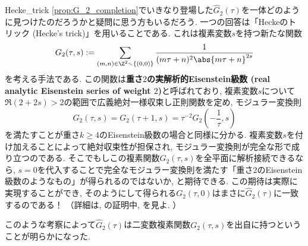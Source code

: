 \documentclass[11pt,b5paper,oneside,lualatex]{ltjsarticle} %
\numberwithin{equation}{section} %
\begin{document}
\begin{rem}{}{Hecke_trick}
	\cref{prop:G_2_completion}でいきなり登場した$ \widehat{G}_2 (\tau) $を一体どのように見つけたのだろうかと疑問に思う方もいるだろう. 
	一つの回答は「Heckeのトリック (Hecke's trick)」を用いることである. 
	これは複素変数$ s $を持つ新たな関数
	\[
	G_2 (\tau, s) := \sum_{(m, n) \in \Z^2 \smallsetminus \{ (0, 0) \}} \frac{1}{(m\tau + n)^2 \abs{m\tau + n}^{2s}}
	\]
	を考える手法である. 
	この関数は\textbf{重さ$ 2 $の実解析的Eisenstein級数 (real analytic Eisenstein series of weight $ 2 $)}と呼ばれており, 
	複素変数$ s $について$ \Re(2+2s) > 2 $の範囲で広義絶対一様収束し正則関数を定め, モジュラー変換則
	\[
	G_2 (\tau, s) = G_2 (\tau+1, s) = \tau^{-2} G_2 \left( - \frac{1}{\tau}, s \right)
	\]
	を満たすことが重さ$ k \ge 4 $のEisenstein級数の場合と同様に分かる. 
	複素変数$ s $を付け加えることによって絶対収束性が担保され, モジュラー変換則が完全な形で成り立つのである. 
	そこでもしこの複素関数$ G_2 (\tau, s) $を全平面に解析接続できるなら, $ s=0 $を代入することで完全なモジュラー変換則を満たす「重さ$ 2 $のEisenstein級数のようなもの」が得られるのではないか, と期待できる. 
	この期待は実際に実現することができ, そのようにして得られる$ G_2 (\tau, 0) $はまさに$ \widehat{G}_2 (\tau) $に一致するのである！
	（詳細は\cite[Theorem 4.10.2]{DS}, \cite[pp.~19, Proposition 6]{1-2-3}の証明中, \cite[Lemma 6.2]{BFOR}を見よ. ）
	
	このような考察によって$ \widehat{G}_2 (\tau) $は二変数複素関数$ G_2 (\tau, s) $を出自に持つということが明らかになった. 
\end{rem}
\end{document}
